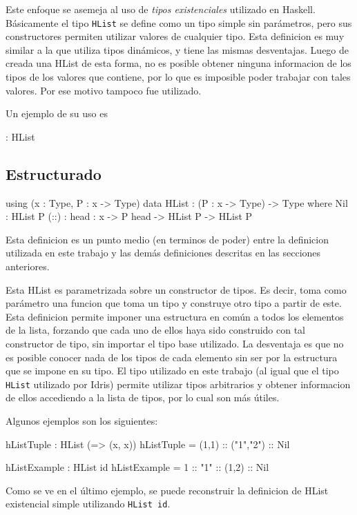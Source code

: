 Este enfoque se asemeja al uso de \textit{tipos existenciales} utilizado en Haskell. Básicamente el tipo \texttt{HList} se define como un tipo simple sin parámetros, pero sus constructores permiten utilizar valores de cualquier tipo.
Esta definicion es muy similar a la que utiliza tipos dinámicos, y tiene las mismas desventajas. Luego de creada una HList de esta forma, no es posible obtener ninguna informacion de los tipos de los valores que contiene, por lo que es imposible poder trabajar con tales valores. Por ese motivo tampoco fue utilizado.

Un ejemplo de su uso es

\begin{code}
[1,"2"] : HList
\end{code}

\subsection{Estructurado}

\begin{code}
using (x : Type, P : x -> Type)        
    data HList : (P : x -> Type) ->  Type where
        Nil : HList P
        (::) : {head : x} -> P head -> HList P -> 
          HList P 
\end{code}

Esta definicion es un punto medio (en terminos de poder) entre la definicion utilizada en este trabajo y las demás definiciones descritas en las secciones anteriores.

Esta HList es parametrizada sobre un constructor de tipos. Es decir, toma como parámetro una funcion que toma un tipo y construye otro tipo a partir de este. Esta definicion permite imponer una estructura en común a todos los elementos de la lista, forzando que cada uno de ellos haya sido construido con tal constructor de tipo, sin importar el tipo base utilizado.
La desventaja es que no es posible conocer nada de los tipos de cada elemento sin ser por la estructura que se impone en su tipo. El tipo utilizado en este trabajo (al igual que el tipo \texttt{HList} utilizado por Idris) permite utilizar tipos arbitrarios y obtener informacion de ellos accediendo a la lista de tipos, por lo cual son más útiles.

Algunos ejemplos son los siguientes:

\begin{code}
hListTuple : HList (\x => (x, x))
hListTuple = (1,1) :: ("1","2") :: Nil

hListExample : HList id
hListExample = 1 :: "1" :: (1,2) :: Nil
\end{code}

Como se ve en el último ejemplo, se puede reconstruir la definicion de HList existencial simple utilizando \texttt{HList id}.
